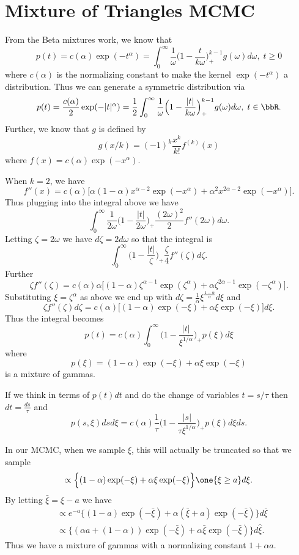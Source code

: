\documentclass{article}
\begin{document}
\section{Mixture of Triangles MCMC}

From the Beta mixtures work, we know that
\[
p(t) = c(\alpha) \exp(-t^\alpha) = \int_0^\infty \frac{1}{\omega} \Big(1 - \frac{t}{k
  \omega}\Big)_+^{k-1} g(\omega) d\omega, \; t \geq 0
\]
where $c(\alpha)$ is the normalizing constant to make the kernel
$\exp(-t^\alpha)$ a distribution.  Thus we can generate a symmetric distribution
via
\[
p(t) = \frac{c(\alpha)}{2} \exp(-|t|^\alpha) 
= \frac{1}{2} \int_0^\infty \frac{1}{\omega} \Big(1 - \frac{|t|}{k
  \omega}\Big)_+^{k-1} g(\omega) d\omega, \; t \in \bbR.
\]
Further, we know that $g$ is defined by
\[
g(x/k) = (-1)^k \frac{x^k}{k!} f^{(k)}(x)
\]
where $f(x) = c(\alpha) \exp(-x^\alpha)$.

When $k=2$, we have 
\[
f''(x) = c(\alpha) \Big[ \alpha (1 - \alpha) x^{\alpha-2} \exp (-x^\alpha) + \alpha^2
x^{2\alpha - 2} \exp(-x^\alpha) \Big].
\]
Thus plugging into the integral above we have
\[
\int_0^\infty \frac{1}{2\omega} \Big(1 - \frac{|t|}{2 \omega}\Big)_+
\frac{(2\omega)^2}{2} f''(2 \omega) d\omega.
\]
Letting $\zeta = 2 \omega$ we have $d \zeta = 2 d \omega$ so that the integral
is
\[
\int_0^\infty \Big(1 - \frac{|t|}{\zeta}\Big)_+ \frac{\zeta}{4} f''(\zeta) d\zeta.
\]
Further
\[
\zeta f''(\zeta) = c(\alpha) \alpha \Big[ (1-\alpha) \zeta^{\alpha - 1}
\exp(\zeta^\alpha) + \alpha \zeta^{2 \alpha - 1} \exp(-\zeta^\alpha) \Big].
\]
Substituting $\xi = \zeta^\alpha$ as above we end up with $d \zeta =
\frac{1}{\alpha} \xi^{\frac{1-\alpha}{\alpha}} d \xi$ and
\[
\zeta f''(\zeta) d \zeta = c(\alpha) \Big[ (1-\alpha) \exp(-\xi) + \alpha \xi
\exp(-\xi) \Big] d \xi.
\]
Thus the integral becomes
\[
p(t) =  c(\alpha) \int_0^\infty \Big( 1 - \frac{|t|}{\xi^{1/\alpha}} \Big)_+
p(\xi) d \xi
\]
where
\[
p(\xi) = (1-\alpha) \exp(-\xi) + \alpha \xi \exp(-\xi)
\]
is a mixture of gammas.

If we think in terms of $p(t) dt$ and do the change of variables $t = s / \tau$
then $dt = \frac{ds}{\tau}$ and
\[
p(s, \xi) ds d\xi = c(\alpha) \frac{1}{\tau} \Big(1 - \frac{|s|}{\tau
  \xi^{1/\alpha}}\Big)_+ p(\xi) d \xi d s.
\]

In our MCMC, when we sample $\xi$, this will actually be truncated so that we
sample
\[
\propto \Big\{ (1-\alpha) \exp(-\xi) + \alpha \xi \exp(-\xi) \Big\} \one \{\xi
\geq a \} d\xi.
\]
By letting $\bar \xi = \xi - a$ we have
\begin{align*}
& \propto e^{-a} \Big\{(1-a) \exp(
{-\bar \xi} ) + \alpha (\bar \xi + a) \exp( {-\bar \xi} )
\Big\} d \bar \xi \\
& \propto \Big\{ (\alpha a + (1-\alpha)) \exp(-\bar \xi) + \alpha \bar \xi \exp(-\bar
\xi) \Big\} d \hat \xi.
\end{align*}
Thus we have a mixture of gammas with a normalizing constant $1 + \alpha a$.
\end{document}
